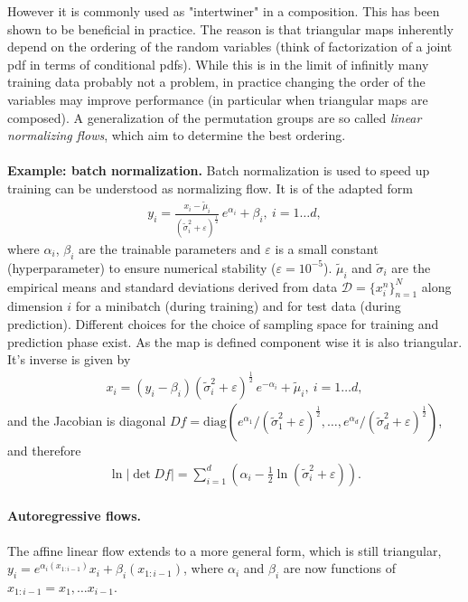 \documentclass[12pt,a4paper]{article}
\begin{document}
However it is commonly used as "intertwiner" in a composition. This has been shown to be beneficial in practice. The reason is that triangular maps inherently depend on the ordering of the random variables (think of factorization of a joint pdf in terms of conditional pdfs). While this is in the limit of infinitly many training data probably not a problem, in practice changing the order of the variables may improve performance (in particular when triangular maps are composed). A generalization of the permutation groups are so called \textit{linear normalizing flows}, which aim to determine the best ordering.
\\ \\
\textbf{Example: batch normalization.} Batch normalization \cite{ioffe_2015_batch_normalization} is used to speed up training can be understood as normalizing flow. It is of the adapted form \cite{papamakarios_2017_maf}
\begin{align}
	y_i = \frac{x_i - \tilde \mu_i}{\left(\tilde \sigma_i^2 +  \varepsilon\right)^{\frac{1}{2}}} \, e^{\alpha_i} + \beta_i, ~ i=1\dots d, 
\end{align}
where $\alpha_i$, $\beta_i$ are the trainable parameters  and $\varepsilon$ is a small constant (hyperparameter) to ensure numerical stability ($\varepsilon=10^{-5}$).  $\tilde \mu_i$ and $\tilde \sigma_i$ are the empirical means and standard deviations derived from data $\mathcal D = \{x_i^{n}\}_{n=1}^N$ along dimension $i$ for a minibatch (during training) and for test data (during prediction).
Different choices for the choice of sampling space for training and prediction phase exist. As the map is defined component wise it is also triangular. It's inverse is given by
\begin{align}
x_i = \left(y_i - \beta_i\right) \left(\tilde \sigma_i^2 +  \varepsilon\right)^{\frac{1}{2}} \, e^{-\alpha_i} + \tilde \mu_i, ~ i=1\dots d, 
\end{align}
and the Jacobian is diagonal $Df = \text{diag}(e^{\alpha_1} /\left(\tilde \sigma_1^2 +  \varepsilon\right)^{\frac{1}{2}}, \dots, e^{\alpha_d} /\left(\tilde \sigma_d^2 +  \varepsilon\right)^{\frac{1}{2}}   )$, and therefore 
\begin{align}
	\ln |\det Df| = \sum_{i=1}^d \left( \alpha_i - \frac{1}{2}\ln\left(\tilde \sigma_i^2 +  \varepsilon\right)\right).
\end{align}

\paragraph{Autoregressive flows.}
The affine linear flow extends to a more general form, which is still triangular, $y_{i} = e^{\alpha_{i}(x_{1:i-1})} x_{i} + \beta_i(x_{1:i-1})$, where $\alpha_{i}$ and $\beta_{i}$ are now functions of $x_{1:i-1} = x_1, \dots x_{i-1}$. 
\end{document}
